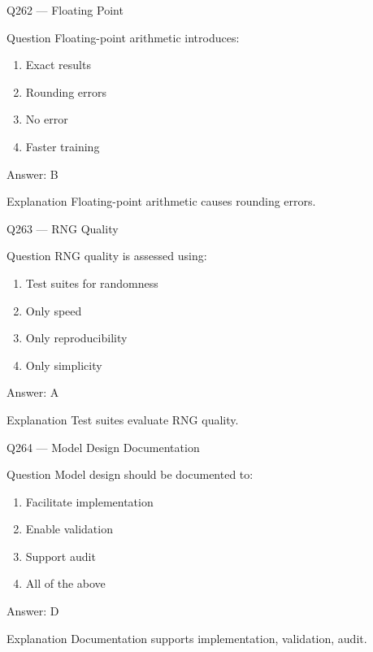 \documentclass[aspectratio=169,8pt]{beamer}
\begin{document}
\begin{frame}{Q262 --- Floating Point}
\begin{block}{Question}
Floating-point arithmetic introduces:
\begin{enumerate}
\item Exact results
\item Rounding errors
\item No error
\item Faster training
\end{enumerate}
\end{block}
\begin{exampleblock}{Answer: B}\end{exampleblock}
\begin{block}{Explanation}
Floating-point arithmetic causes rounding errors.
\end{block}
\end{frame}

\begin{frame}{Q263 --- RNG Quality}
\begin{block}{Question}
RNG quality is assessed using:
\begin{enumerate}
\item Test suites for randomness
\item Only speed
\item Only reproducibility
\item Only simplicity
\end{enumerate}
\end{block}
\begin{exampleblock}{Answer: A}\end{exampleblock}
\begin{block}{Explanation}
Test suites evaluate RNG quality.
\end{block}
\end{frame}

\begin{frame}{Q264 --- Model Design Documentation}
\begin{block}{Question}
Model design should be documented to:
\begin{enumerate}
\item Facilitate implementation
\item Enable validation
\item Support audit
\item All of the above
\end{enumerate}
\end{block}
\begin{exampleblock}{Answer: D}\end{exampleblock}
\begin{block}{Explanation}
Documentation supports implementation, validation, audit.
\end{block}
\end{frame}
\end{document}
